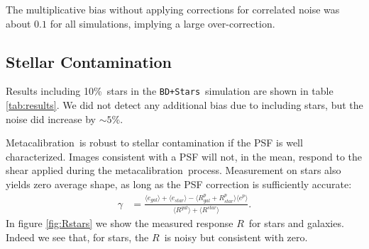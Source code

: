 \documentclass[usegraphicx,usenatbib]{mn2e}
\newcommand{\mcal}{metacalibration}
\newcommand{\Mcal}{Metacalibration}
\newcommand{\mcalR}{$R$}
\newcommand{\nsimNStar}{$4 \times 10^7$}
\newcommand{\nsimNstarperc}{10\%}
\newcommand{\bdsim}{\texttt{BD}}
\newcommand{\bdstar}{\texttt{BD+Stars}}
\begin{document}
The multiplicative bias without applying corrections for correlated noise
was about $0.1$ for all simulations, implying a large over-correction.


\subsection{Stellar Contamination} \label{sec:stars}

Results including \nsimNstarperc\ stars in the \bdstar\ simulation are shown in
table \ref{tab:results}. We did not detect any additional bias due to including
stars, but the noise did increase by $\sim 5$\%.


\Mcal\ is robust to stellar contamination if the PSF is well
characterized.  Images consistent with a PSF will not, in the mean, respond to the shear
applied during the \mcal\ process.  Measurement on stars also yields zero average shape, as
long as the PSF correction is sufficiently accurate:
\begin{align}
    \gamma &= \frac{ \langle e_{gal} \rangle + \langle e_{star} \rangle - \langle R^p_{gal} + R^p_{star} \rangle \langle e^p \rangle }{ \langle R^{gal} \rangle + \langle R^{star} \rangle}.
\end{align}
In figure \ref{fig:Rstars} we show the measured response \mcalR\ for stars
and galaxies.  Indeed we see that, for stars, the \mcalR\ is noisy but consistent with
zero.
\end{document}
